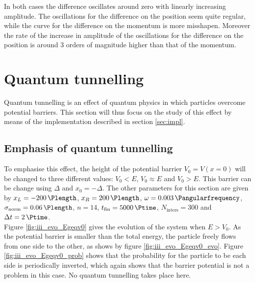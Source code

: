\documentclass[a4paper,12pt,twoside]{article}
\begin{document}
In both cases the difference oscillates around zero with linearly increasing amplitude. The oscillations for the difference on the position seem quite regular, while the curve for the difference on the momentum is more misshapen. Moreover the rate of the increase in amplitude of the oscillations for the difference on the position is around 3 orders of magnitude higher than that of the momentum.


\newpage
\section{Quantum tunnelling}\label{sec:quantum_tunnelling}
  Quantum tunnelling is an effect of quantum physics in which particles overcome potential barriers. \cite{wiki:quantum_tunnelling}
  This section will thus focus on the study of this effect by means of the implementation described in section \ref{sec:impl}.\\

  \subsection{Emphasis of quantum tunnelling}
    To emphasise this effect, the height of the potential barrier $V_0 = V(x=0)$ will be changed to three different values: $V_0<E$, $V_0 \approx E$ and $V_0>E$.
    This barrier can be change using $\Delta$ and $x_0 = -\Delta$.
    The other parameters for this section are given by $x_L=\SI{-200}{\Plength}$, $x_R=\SI{200}{\Plength}$, $\omega = \SI{0.003}{\Pangularfrequency}$, $\sigma_\text{norm} = \SI{0.06}{\Plength}$, $n=14$, $t_\text{fin} = \SI{5000}{\Ptime}$, $N_\text{inters} = 300$ and $\Delta t = \SI{2}{\Ptime}$.\\

    Figure \ref{fig:iii_evo_Egeqv0} gives the evolution of the system when $E > V_0$.
    As the potential barrier is smaller than the total energy, the particle freely flows from one side to the other, as shows by figure \ref{fig:iii_evo_Egeqv0_evo}.
    Figure \ref{fig:iii_evo_Egeqv0_prob} shows that the probability for the particle to be each side is periodically inverted, which again shows that the barrier potential is not a problem in this case.
    No quantum tunnelling takes place here.\\
\end{document}
